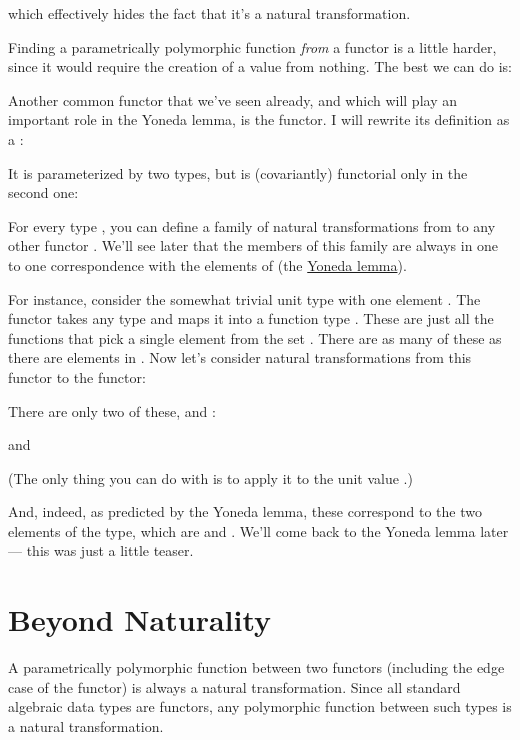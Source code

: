 which effectively hides the fact that it's a natural transformation.

Finding a parametrically polymorphic function \emph{from} a
 functor is a little harder, since it would require the
creation of a value from nothing. The best we can do is:

Another common functor that we've seen already, and which will play an
important role in the Yoneda lemma, is the  functor. I
will rewrite its definition as a :

It is parameterized by two types, but is (covariantly) functorial only
in the second one:

For every type , you can define a family of natural
transformations from  to any other functor .
We'll see later that the members of this family are always in one to one
correspondence with the elements of  (the
\hyperref[the-yoneda-lemma]{Yoneda lemma}).

For instance, consider the somewhat trivial unit type \code{()} with
one element \code{()}. The functor  takes any type
 and maps it into a function type .
These are just all the functions that pick a single element from the set
. There are as many of these as there are elements in
. Now let's consider natural transformations from this functor
to the  functor:

There are only two of these,  and :

and

(The only thing you can do with  is to apply it to the unit
value \code{()}.)

And, indeed, as predicted by the Yoneda lemma, these correspond to the
two elements of the  type, which are 
and . We'll come back to the Yoneda lemma later ---
this was just a little teaser.

\section{Beyond Naturality}

A parametrically polymorphic function between two functors (including
the edge case of the  functor) is always a natural
transformation. Since all standard algebraic data types are functors,
any polymorphic function between such types is a natural transformation.

